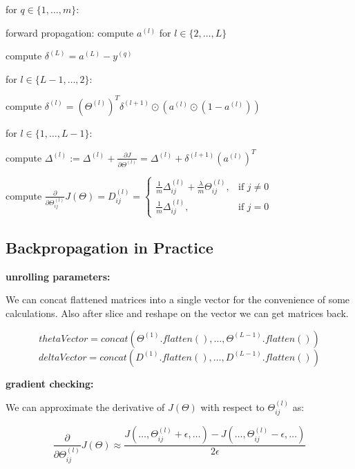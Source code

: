 \documentclass{article}
\begin{document}
\noindent for \(q \in \{1, \dots, m\}\):

\noindent \hspace{.5cm} forward propagation: compute \(a^{(l)}\) for \(l \in \{2, \dots, L\}\)

\noindent \hspace{.5cm} compute \(\delta^{(L)} = a^{(L)} - y^{(q)}\)

\noindent \hspace{.5cm} for \(l \in \{L - 1, \dots, 2\}\):

\noindent \hspace{1cm} compute \(\delta^{(l)} = (\Theta^{(l)})^T \delta^{(l + 1)} \odot (a^{(l)} \odot (1 - a^{(l)}))\)

\noindent \hspace{.5cm} for \(l \in \{1, \dots, L - 1\}\):

\noindent \hspace{1cm} compute \(\Delta^{(l)} := \Delta^{(l)} + \frac{\partial J}{\partial \Theta^{(l)}} = \Delta^{(l)} + \delta^{(l + 1)}(a^{(l)})^T\)

\noindent compute \(\frac{\partial}{\partial \Theta_{ij}^{(l)}} J(\Theta) = D_{ij}^{(l)} = 
\begin{cases}
  \frac{1}{m} \Delta_{ij}^{(l)} + \frac{\lambda}{m} \Theta_{ij}^{(l)}, & \text{if } j \neq 0 \\
  \frac{1}{m} \Delta_{ij}^{(l)}, & \text{if } j = 0
\end{cases}
\)

\subsection{Backpropagation in Practice}

\noindent \textbf{unrolling parameters:}

\noindent We can concat flattened matrices into a single vector for the convenience of some calculations. Also after slice and reshape on the vector we can get matrices back.

\[thetaVector = concat(\Theta^{(1)}.flatten(), \dots, \Theta^{(L - 1)}.flatten())\]
\[deltaVector = concat(D^{(1)}.flatten(), \dots, D^{(L - 1)}.flatten())\]

\noindent \textbf{gradient checking:}

\noindent We can approximate the derivative of \(J(\Theta)\) with respect to \(\Theta_{ij}^{(l)}\) as:

\[\frac{\partial}{\partial \Theta_{ij}^{(l)}} J(\Theta) \approx \frac{J(\dots, \Theta_{ij}^{(l)} + \epsilon, \dots) - J(\dots, \Theta_{ij}^{(l)} - \epsilon, \dots)}{2\epsilon}\]
\end{document}
